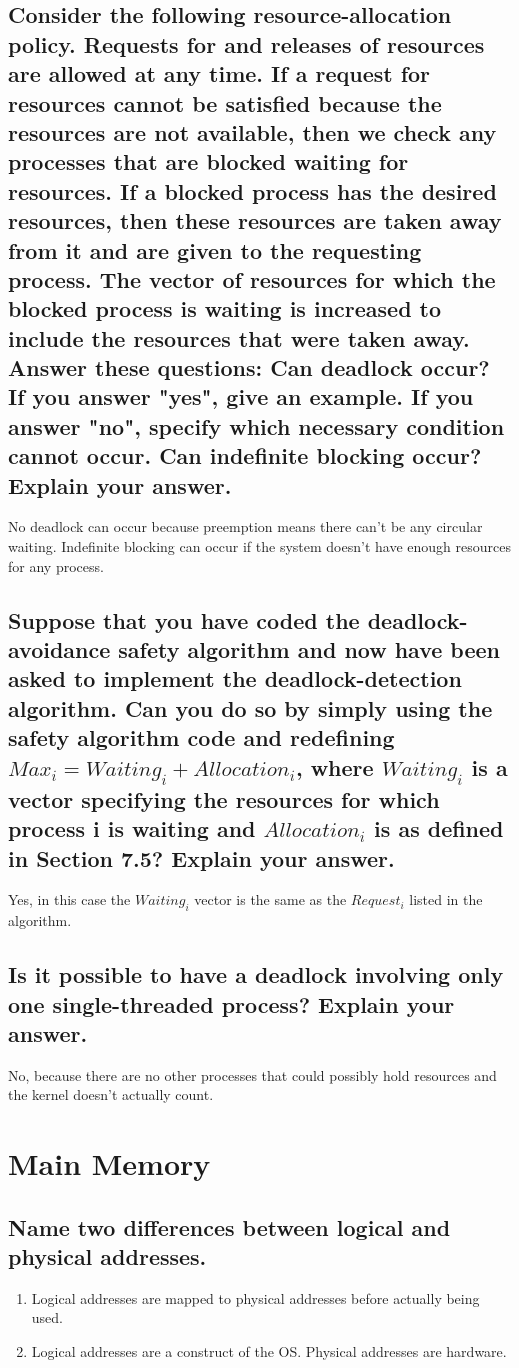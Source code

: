 \documentclass{book}%
\begin{document}
\section{Consider the following resource-allocation policy. Requests for and releases of resources are allowed at any time. If a request for resources cannot be satisfied because the resources are not available, then we check any processes that are blocked waiting for resources. If a blocked process has the desired resources, then these resources are taken away from it and are given to the requesting process. The vector of resources for which the blocked process is waiting is increased to include the resources that were taken away. Answer these questions: Can deadlock occur? If you answer "yes", give an example. If you answer "no", specify which necessary condition cannot occur. Can indefinite blocking occur? Explain your answer.}
No deadlock can occur because preemption means there can't be any circular waiting. Indefinite blocking can occur if the system doesn't have enough resources for any process. 
\section{Suppose that you have coded the deadlock-avoidance safety algorithm and now have been asked to implement the deadlock-detection algorithm. Can you do so by simply using the safety algorithm code and redefining $ Max_i = Waiting_i + Allocation_i$, where $Waiting_i$ is a vector specifying the resources for which process i is waiting and $Allocation_i$ is as defined in Section 7.5? Explain your answer.}
Yes, in this case the $Waiting_i$ vector is the same as the $Request_i$ listed in the algorithm.
\section{Is it possible to have a deadlock involving only one single-threaded process? Explain your answer.}
No, because there are no other processes that could possibly hold resources and the kernel doesn't actually count.
\chapter{Main Memory}
\section{Name two differences between logical and physical addresses.}
\begin{enumerate}
\item Logical addresses are mapped to physical addresses before actually being used.
\item Logical addresses are a construct of the OS. Physical addresses are hardware.
\end{enumerate}
\end{document}
